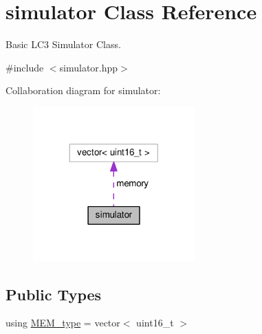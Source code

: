 \hypertarget{classsimulator}{\section{simulator Class Reference}
\label{classsimulator}
}


Basic L\-C3 Simulator Class.  




{\ttfamily \#include $<$simulator.\-hpp$>$}



Collaboration diagram for simulator\-:
\nopagebreak
\begin{figure}[H]
\begin{center}
\leavevmode
\includegraphics[width=176pt]{classsimulator__coll__graph}
\end{center}
\end{figure}
\subsection*{Public Types}
\begin{DoxyCompactItemize}
\item 
using \hyperlink{classsimulator_af29328ef8d8d6120a91a379c2801b44b}{M\-E\-M\-\_\-type} = vector$<$ uint16\-\_\-t $>$
\end{DoxyCompactItemize}
